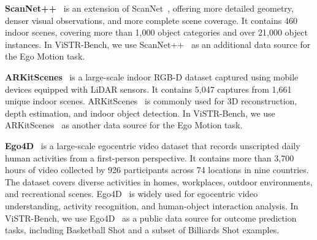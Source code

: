 \noindent\textbf{ScanNet++}~\citep{ScanNet++} is an extension of ScanNet~\citep{ScanNet}, offering more detailed geometry, denser visual observations, and more complete scene coverage.
It contains 460 indoor scenes, covering more than 1,000 object categories and over 21,000 object instances.
In ViSTR-Bench, we use ScanNet++~\citep{ScanNet++} as an additional data source for the Ego Motion task.

\noindent\textbf{ARKitScenes}~\citep{ARKitScenes} is a large-scale indoor RGB-D dataset captured using mobile devices equipped with LiDAR sensors. It contains 5,047 captures from 1,661 unique indoor scenes. ARKitScenes~\citep{ARKitScenes} is commonly used for 3D reconstruction, depth estimation, and indoor object detection.
In ViSTR-Bench, we use ARKitScenes~\citep{ARKitScenes} as another data source for the Ego Motion task.

\noindent\textbf{Ego4D}~\citep{Ego4D} is a large-scale egocentric video dataset that records unscripted daily human activities from a first-person perspective. It contains more than 3,700 hours of video collected by 926 participants across 74 locations in nine countries. The dataset covers diverse activities in homes, workplaces, outdoor environments, and recreational scenes. Ego4D~\citep{Ego4D} is widely used for egocentric video understanding, activity recognition, and human-object interaction analysis.
In ViSTR-Bench, we use Ego4D~\citep{Ego4D} as a public data source for outcome prediction tasks, including Basketball Shot and a subset of Billiards Shot examples.

